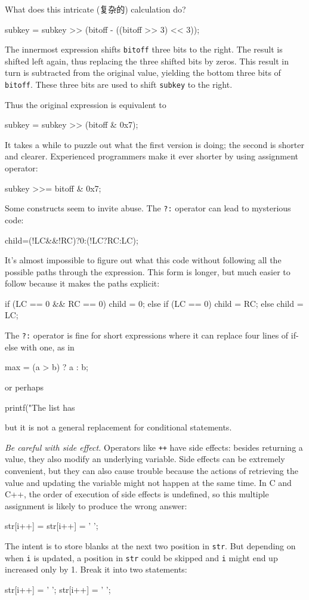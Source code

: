 What does this intricate (复杂的) calculation do?
\begin{badcode}
    subkey = subkey >> (bitoff - ((bitoff >> 3) << 3));
\end{badcode}
The innermost expression shifts \verb"bitoff" three bits to the right. The
result is shifted left again, thus replacing the three shifted bits by
zeros. This result in turn is subtracted from the original value, yielding
the bottom three bits of \verb"bitoff". These three bits are used to shift
\verb'subkey' to the right.

Thus the original expression is equivalent to 
\begin{wellcode}
    subkey = subkey >> (bitoff & 0x7);
\end{wellcode}
It takes a while to puzzle out what the first version is doing; the second
is shorter and clearer. Experienced programmers make it ever shorter by
using assignment operator:
\begin{wellcode}
    subkey >>= bitoff & 0x7;
\end{wellcode}
Some constructs seem to invite abuse. The \verb"?:" operator can lead to
mysterious code:
\begin{badcode}
    child=(!LC&&!RC)?0:(!LC?RC:LC);
\end{badcode}
It's almost impossible to figure out what this code without following all
the possible paths through the expression. This form is longer, but much
easier to follow because it makes the paths explicit:
\begin{wellcode}
    if (LC == 0 && RC == 0)
        child = 0;
    else if (LC == 0)
        child = RC;
    else
        child = LC;
\end{wellcode}
The \verb'?:' operator is fine for short expressions where it can replace
four lines of if-else with one, as in
\begin{wellcode}
    max = (a > b) ? a : b;
\end{wellcode}
or perhaps
\begin{wellcode}
    printf("The list has %
\end{wellcode}
but it is not a general replacement for conditional statements.

\emph{Be careful with side effect.} Operators like \verb'++' have side
effects: besides returning a value, they also modify an underlying
variable. Side effects can be extremely convenient, but they can also cause
trouble because the actions of retrieving the value and updating the
variable might not happen at the same time. In C and C++, the order of
execution of side effects is undefined, so this multiple assignment is
likely to produce the wrong answer:
\begin{badcode}
    str[i++] = str[i++] = ' ';
\end{badcode}
The intent is to store blanks at the next two position in \verb'str'. But
depending on when \verb'i' is updated, a position in \verb'str' could be
skipped and \verb'i' might end up increased only by 1. Break it into two
statements:
\begin{wellcode}
    str[i++] = ' ';
    str[i++] = ' ';
\end{wellcode}

